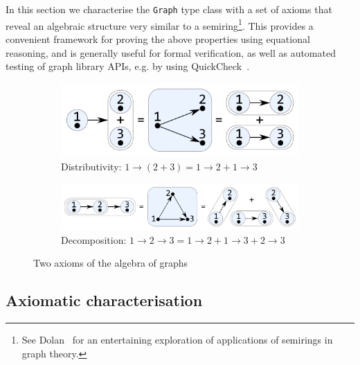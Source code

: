 \documentclass[acmlarge,anonymous]{acmart}\settopmatter{printfolios=true}
\newcommand{\hs}{\texttt}
\begin{document}
In this section we characterise the \hs{Graph} type class with a set of
axioms that reveal an algebraic structure very similar to a semiring\footnote{
See Dolan~\citeyear{2013_semirings_dolan} for an entertaining exploration of
applications of semirings in graph theory.}.
This provides a convenient framework for proving the above properties using equational
reasoning, and is generally useful for formal verification, as well as automated testing
of graph library APIs, e.g. by using QuickCheck~\cite{2011_quickcheck_claessen}.

\begin{figure}
\begin{subfigure}[b]{0.4\linewidth}
\centerline{\includegraphics[scale=0.27]{fig/ax-distributivity.pdf}}
\caption{Distributivity: $1 \rightarrow (2 + 3) = 1 \rightarrow 2 + 1 \rightarrow 3$ }
\end{subfigure}
\hspace{12mm}
\begin{subfigure}[b]{0.5\linewidth}
\centerline{\includegraphics[scale=0.27]{fig/ax-decomposition.pdf}}
\caption{Decomposition: $1 \rightarrow 2 \rightarrow 3 = 1 \rightarrow 2 +
1 \rightarrow 3 + 2 \rightarrow 3$}
\end{subfigure}
\vspace{-3mm}
\caption{Two axioms of the algebra of graphs\label{fig-axioms}}
\vspace{-4mm}
\end{figure}

\subsection{Axiomatic characterisation}\label{sub-laws}
\end{document}
